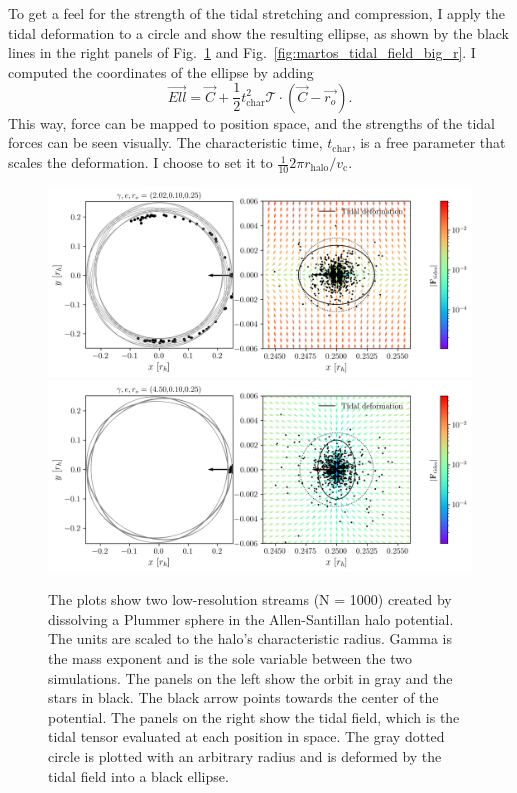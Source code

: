             To get a feel for the strength of the tidal stretching and compression, I apply the tidal deformation to a circle and show the resulting ellipse, as shown by the black lines in the right panels of Fig.~\ref{fig:martos_tidal_field_small_r} and Fig.~\ref{fig:martos_tidal_field_big_r}. I computed the coordinates of the ellipse by adding 
            \begin{equation}
            \vec{Ell} = \vec{C} + \frac{1}{2} t_\textrm{char}^2 \mathcal{T}\cdot \left(\vec{C} - \vec{r_o}\right).
            \end{equation} 
            This way, force can be mapped to position space, and the strengths of the tidal forces can be seen visually. The characteristic time, $t_\textrm{char}$, is a free parameter that scales the deformation. I choose to set it to $\frac{1}{10} 2\pi r_\textrm{halo} / v_\textrm{c}$. 
            \begin{figure}
                \includegraphics[width=\linewidth]{images/martos_tidal_field_202_10_25.png}
                \includegraphics[width=\linewidth]{images/martos_tidal_field_450_10_25.png}
                \caption{The plots show two low-resolution streams (N = 1000) created by dissolving a Plummer sphere in the Allen-Santillan halo potential. The units are scaled to the halo's characteristic radius. Gamma is the mass exponent and is the sole variable between the two simulations. The panels on the left show the orbit in gray and the stars in black. The black arrow points towards the center of the potential. The panels on the right show the tidal field, which is the tidal tensor evaluated at each position in space. The gray dotted circle is plotted with an arbitrary radius and is deformed by the tidal field into a black ellipse.}
                \label{fig:martos_tidal_field_small_r}
            \end{figure}

